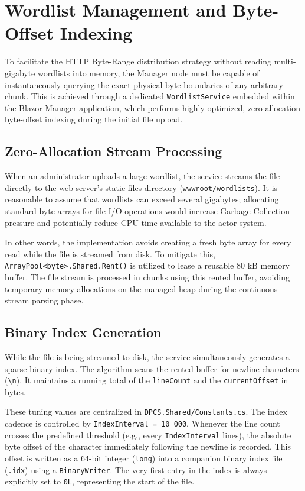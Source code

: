 \section{Wordlist Management and Byte-Offset Indexing}
\label{sec:wordlist_indexing}

To facilitate the HTTP Byte-Range distribution strategy without reading multi-gigabyte wordlists into memory, the Manager node must be capable of instantaneously querying the exact physical byte boundaries of any arbitrary chunk. This is achieved through a dedicated \verb|WordlistService| embedded within the Blazor Manager application, which performs highly optimized, zero-allocation byte-offset indexing during the initial file upload.

\subsection{Zero-Allocation Stream Processing}
When an administrator uploads a large wordlist, the service streams the file directly to the web server's static files directory (\verb|wwwroot/wordlists|). It is reasonable to assume that wordlists can exceed several gigabytes; allocating standard byte arrays for file I/O operations would increase Garbage Collection pressure and potentially reduce CPU time available to the actor system.

In other words, the implementation avoids creating a fresh byte array for every read while the file is streamed from disk. To mitigate this, \verb|ArrayPool<byte>.Shared.Rent()| \cite{dotnet_arraypool} is utilized to lease a reusable 80 kB memory buffer. The file stream is processed in chunks using this rented buffer, avoiding temporary memory allocations on the managed heap during the continuous stream parsing phase.

\subsection{Binary Index Generation}
While the file is being streamed to disk, the service simultaneously generates a sparse binary index. The algorithm scans the rented buffer for newline characters (\verb|\n|). It maintains a running total of the \verb|lineCount| and the \verb|currentOffset| in bytes. 

These tuning values are centralized in \verb|DPCS.Shared/Constants.cs|. The index cadence is controlled by \verb|IndexInterval = 10_000|. Whenever the line count crosses the predefined threshold (e.g., every \verb|IndexInterval| lines), the absolute byte offset of the character immediately following the newline is recorded. This offset is written as a 64-bit integer (\verb|long|) into a companion binary index file (\verb|.idx|) using a \verb|BinaryWriter|. The very first entry in the index is always explicitly set to \verb|0L|, representing the start of the file.

